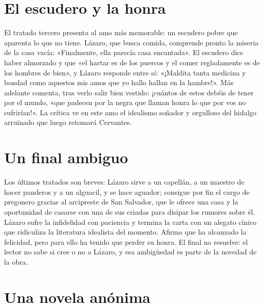 \documentclass{book}
\begin{document}

\section{El escudero y la honra}

El tratado tercero presenta al amo más memorable: un escudero pobre que aparenta lo que no tiene. Lázaro, que busca comida, comprende pronto la miseria de la casa vacía: «Finalmente, ella parecía casa encantada». El escudero dice haber almorzado y que «el hartar es de los puercos y el comer regladamente es de los hombres de bien», y Lázaro responde entre sí: «¡Maldita tanta medicina y bondad como aquestos mis amos que yo hallo hallan en la hambre!». Más adelante comenta, tras verlo salir bien vestido: ¡cuántos de estos debéis de tener por el mundo, «que padecen por la negra que llaman honra lo que por vos no sufrirían!». La crítica ve en este amo el idealismo soñador y orgulloso del hidalgo arruinado que luego retomará Cervantes.


\section{Un final ambiguo}

Los últimos tratados son breves: Lázaro sirve a un capellán, a un maestro de hacer panderos y a un alguacil, y se hace aguador; consigue por fin el cargo de pregonero gracias al arcipreste de San Salvador, que le ofrece una casa y la oportunidad de casarse con una de sus criadas para disipar los rumores sobre él. Lázaro sufre la infidelidad con paciencia y termina la carta con un alegato cínico que ridiculiza la literatura idealista del momento. Afirma que ha alcanzado la felicidad, pero para ello ha tenido que perder su honra. El final no resuelve: el lector no sabe si cree o no a Lázaro, y esa ambigüedad es parte de la novedad de la obra.


\section{Una novela anónima}
\end{document}
